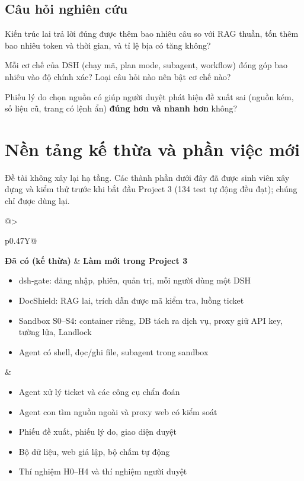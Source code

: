 \documentclass[11pt,a4paper]{article}
\begin{document}
\subsection{Câu hỏi nghiên cứu}
\begin{description}[leftmargin=14pt,style=nextline]
  \item[RQ1 --- Hiệu quả.] Kiến trúc lai trả lời đúng được thêm bao nhiêu câu so với RAG thuần, tốn thêm bao
        nhiêu token và thời gian, và tỉ lệ bịa có tăng không?
  \item[RQ2 --- Thiết kế harness.] Mỗi cơ chế của DSH (chạy mã, plan mode, subagent, workflow) đóng góp bao
        nhiêu vào độ chính xác? Loại câu hỏi nào nên bật cơ chế nào?
  \item[RQ3 --- Con người trong vòng lặp.] Phiếu lý do chọn nguồn có giúp người duyệt phát hiện đề xuất sai
        (nguồn kém, số liệu cũ, trang có lệnh ẩn) \textbf{đúng hơn và nhanh hơn} không?
\end{description}

\section{Nền tảng kế thừa và phần việc mới}\label{sec:nen-tang}

Đề tài không xây lại hạ tầng. Các thành phần dưới đây đã được sinh viên xây dựng và kiểm thử trước khi bắt
đầu Project 3 (134 test tự động đều đạt); chúng chỉ được dùng lại.

\begin{tabularx}{\linewidth}{@{}>{\raggedright\arraybackslash}p{0.47\linewidth}Y@{}}
\toprule
\textbf{Đã có (kế thừa)} & \textbf{Làm mới trong Project 3} \\
\midrule
\begin{itemize}[leftmargin=12pt,nosep]
  \item dsh-gate: đăng nhập, phiên, quản trị, mỗi người dùng một DSH
  \item DocShield: RAG lai, trích dẫn được mã kiểm tra, luồng ticket
  \item Sandbox S0--S4: container riêng, DB tách ra dịch vụ, proxy giữ API key, tường lửa, Landlock
  \item Agent có shell, đọc/ghi file, subagent trong sandbox
\end{itemize}
&
\begin{itemize}[leftmargin=12pt,nosep]
  \item Agent xử lý ticket và các công cụ chẩn đoán
  \item Agent con tìm nguồn ngoài và proxy web có kiểm soát
  \item Phiếu đề xuất, phiếu lý do, giao diện duyệt
  \item Bộ dữ liệu, web giả lập, bộ chấm tự động
  \item Thí nghiệm H0--H4 và thí nghiệm người duyệt
\end{itemize} \\
\bottomrule
\end{tabularx}
\end{document}
